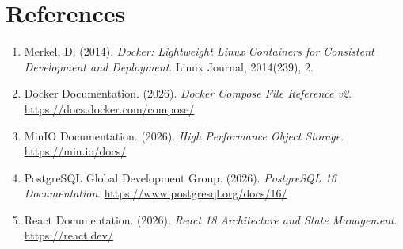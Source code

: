 \documentclass[11pt,a4paper]{report}
\begin{document}
\section{References}
\begin{enumerate}[itemsep=1pt,topsep=1pt]
    \item Merkel, D. (2014). \textit{Docker: Lightweight Linux Containers for Consistent Development and Deployment}. Linux Journal, 2014(239), 2.
    \item Docker Documentation. (2026). \textit{Docker Compose File Reference v2}. \url{https://docs.docker.com/compose/}
    \item MinIO Documentation. (2026). \textit{High Performance Object Storage}. \url{https://min.io/docs/}
    \item PostgreSQL Global Development Group. (2026). \textit{PostgreSQL 16 Documentation}. \url{https://www.postgresql.org/docs/16/}
    \item React Documentation. (2026). \textit{React 18 Architecture and State Management}. \url{https://react.dev/}
\end{enumerate}
\end{document}
